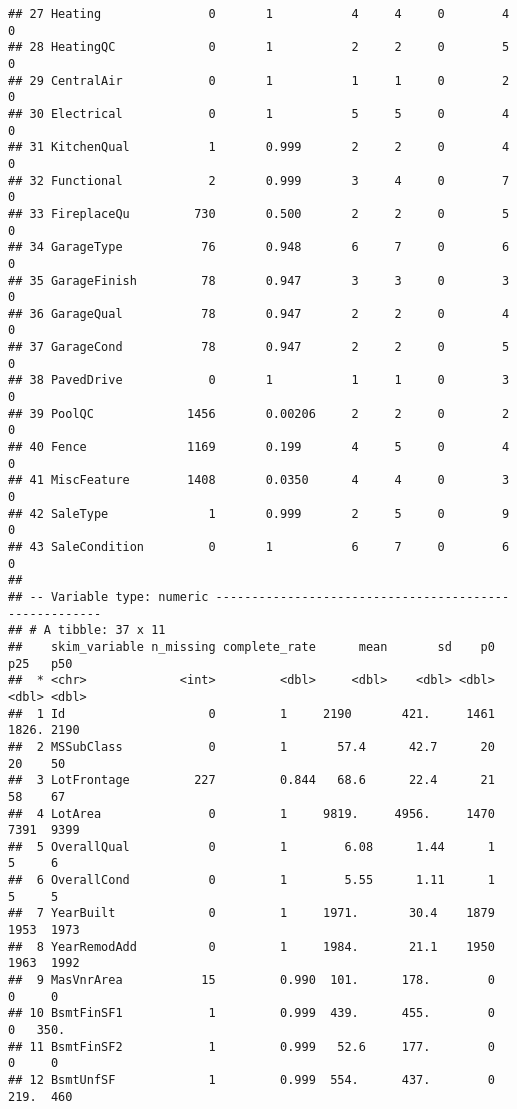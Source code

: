 \documentclass[
]{article}
\begin{document}
\begin{verbatim}
## 27 Heating               0       1           4     4     0        4          0
## 28 HeatingQC             0       1           2     2     0        5          0
## 29 CentralAir            0       1           1     1     0        2          0
## 30 Electrical            0       1           5     5     0        4          0
## 31 KitchenQual           1       0.999       2     2     0        4          0
## 32 Functional            2       0.999       3     4     0        7          0
## 33 FireplaceQu         730       0.500       2     2     0        5          0
## 34 GarageType           76       0.948       6     7     0        6          0
## 35 GarageFinish         78       0.947       3     3     0        3          0
## 36 GarageQual           78       0.947       2     2     0        4          0
## 37 GarageCond           78       0.947       2     2     0        5          0
## 38 PavedDrive            0       1           1     1     0        3          0
## 39 PoolQC             1456       0.00206     2     2     0        2          0
## 40 Fence              1169       0.199       4     5     0        4          0
## 41 MiscFeature        1408       0.0350      4     4     0        3          0
## 42 SaleType              1       0.999       2     5     0        9          0
## 43 SaleCondition         0       1           6     7     0        6          0
## 
## -- Variable type: numeric ------------------------------------------------------
## # A tibble: 37 x 11
##    skim_variable n_missing complete_rate      mean       sd    p0   p25   p50
##  * <chr>             <int>         <dbl>     <dbl>    <dbl> <dbl> <dbl> <dbl>
##  1 Id                    0         1     2190       421.     1461 1826. 2190 
##  2 MSSubClass            0         1       57.4      42.7      20   20    50 
##  3 LotFrontage         227         0.844   68.6      22.4      21   58    67 
##  4 LotArea               0         1     9819.     4956.     1470 7391  9399 
##  5 OverallQual           0         1        6.08      1.44      1    5     6 
##  6 OverallCond           0         1        5.55      1.11      1    5     5 
##  7 YearBuilt             0         1     1971.       30.4    1879 1953  1973 
##  8 YearRemodAdd          0         1     1984.       21.1    1950 1963  1992 
##  9 MasVnrArea           15         0.990  101.      178.        0    0     0 
## 10 BsmtFinSF1            1         0.999  439.      455.        0    0   350.
## 11 BsmtFinSF2            1         0.999   52.6     177.        0    0     0 
## 12 BsmtUnfSF             1         0.999  554.      437.        0  219.  460 

\end{verbatim}
\end{document}
